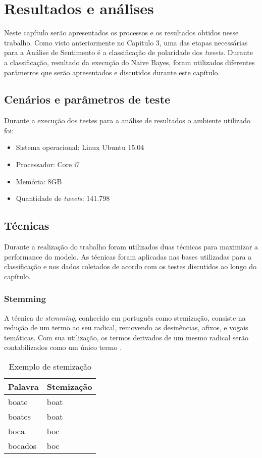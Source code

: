 \chapter{Resultados e análises}\label{cap:resultados}

Neste capítulo serão apresentados os processos e os resultados obtidos nesse trabalho. Como visto anteriormente no Capitulo 3,  uma das etapas
necessárias para a Análise de Sentimento é a classificação de polaridade dos \textit{tweets}. Durante a classificação, resultado da execução do Naive Bayes, foram utilizados diferentes parâmetros que serão apresentados e discutidos durante este capítulo.

\section{Cenários e parâmetros de teste}\label{sec:cenarios}
Durante a execução dos testes para a análise de resultados o ambiente utilizado foi:
\begin{itemize}
	\item Sistema operacional: Linux Ubuntu 15.04
	\item Processador: Core i7
	\item Memória: 8GB
	\item Quantidade de \textit{tweets}: 141.798
\end{itemize}

\section{Técnicas}
Durante a realização do trabalho foram utilizados duas técnicas para maximizar a performance do modelo. As técnicas foram aplicadas nas bases utilizadas para a classificação e nos dados coletados de acordo com os testes discutidos ao longo do capítulo.

\subsection{Stemming}
A técnica de \textit{stemming}, conhecido em português como stemização, consiste na redução de um termo ao seu radical, removendo as desinências, afixos, e vogais temáticas. Com sua utilização, os termos derivados de um mesmo radical serão contabilizados como um único termo \cite{989755}.

\begin{table}[H]
	\centering
	\caption{Exemplo de stemização}
	\label{my-label}
	\begin{tabular}{|l|l|}
		\hline
		\multicolumn{1}{|c|}{Palavra} & \multicolumn{1}{c|}{Stemização} \\ \hline
		boate                         & boat                            \\ \hline
		boates                        & boat                            \\ \hline
		boca                          & boc                             \\ \hline
		bocados                       & boc                             \\ \hline
	\end{tabular}
\end{table}

